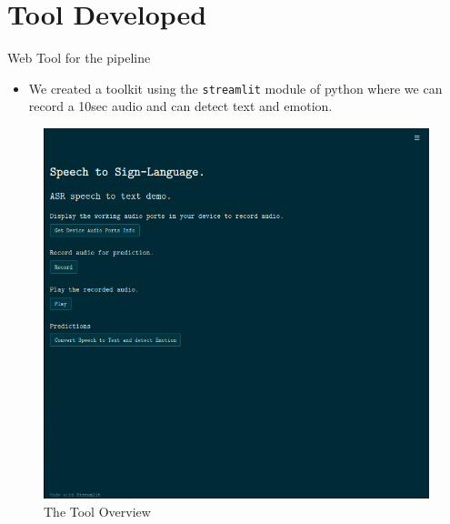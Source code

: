\documentclass[10pt]{beamer}
\begin{document}
\section{Tool Developed}
\begin{frame}{Web Tool for the pipeline}
\begin{itemize}
	\item We created a toolkit using the \texttt{streamlit} module of python where we can record a 10sec audio and can detect text and emotion.
\end{itemize}
\begin{minipage}{0.3\textwidth}
\centering
\begin{figure}
	\includegraphics[width=\textwidth]{images/streamlit_app1.png}
	\caption{The Tool Overview}
\end{figure}
\end{minipage}
\begin{minipage}{0.3\textwidth}
\centering
\begin{figure}

\end{figure}
\end{minipage}
\end{frame}
\end{document}
